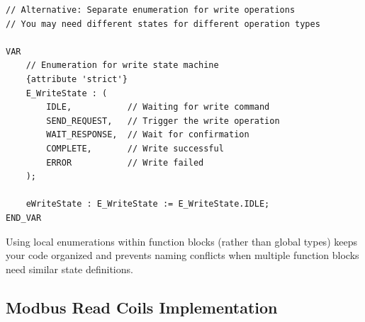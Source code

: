 \documentclass[11pt,a4paper]{article}
\begin{document}
\begin{lstlisting}
// Alternative: Separate enumeration for write operations
// You may need different states for different operation types

VAR
    // Enumeration for write state machine
    {attribute 'strict'}
    E_WriteState : (
        IDLE,           // Waiting for write command
        SEND_REQUEST,   // Trigger the write operation
        WAIT_RESPONSE,  // Wait for confirmation
        COMPLETE,       // Write successful
        ERROR           // Write failed
    );
    
    eWriteState : E_WriteState := E_WriteState.IDLE;
END_VAR
\end{lstlisting}

\begin{tipbox}
Using local enumerations within function blocks (rather than global types) keeps your code organized and prevents naming conflicts when multiple function blocks need similar state definitions.
\end{tipbox}

\subsection{Modbus Read Coils Implementation}
\end{document}
